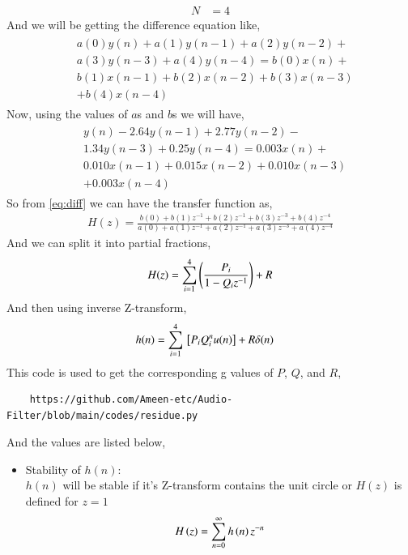 \documentclass[journal,12pt,twocolumn]{IEEEtran}
\theoremstyle{remark}
\begin{document}
\begin{enumerate}[label=\thesection.\arabic*]
\begin{align}
    N&=4
\end{align}
And we will be getting the difference equation like,
\begin{align}
\begin{split}
    &a(0)y(n)+a(1)y(n-1)+a(2)y(n-2)+\\
    &a(3)y(n-3)+a(4)y(n-4)=b(0)x(n)+\\
    &b(1)x(n-1)+b(2)x(n-2)+b(3)x(n-3)\\
    &+b(4)x(n-4) \label{eq:diff}
\end{split}
\end{align}
Now, using the values of $a$s and $b$s we will have,
\begin{align}
    \begin{split}
        &y(n)-2.64y(n-1)+2.77y(n-2)-\\
    &1.34y(n-3)+0.25y(n-4)=0.003x(n)+\\
    &0.010x(n-1)+0.015x(n-2)+0.010x(n-3)\\
    &+0.003x(n-4)
    \end{split}
\end{align}
So from \eqref{eq:diff} we can have the transfer function as,
\begin{align}
    H(z)=\frac{b(0)+b(1)z^{-1}+b(2)z^{-1}+b(3)z^{-3}+b(4)z^{-4}}{a(0)+a(1)z^{-1}+a(2)z^{-1}+a(3)z^{-3}+a(4)z^{-4}}
\end{align}
And we can split it into partial fractions,
\begin{align}
    H(z)=\sum_{i=1}^{4}\left(\frac{P_i}{1-Q_iz^{-1}}\right)+R
\end{align}
And then using inverse Z-transform,
\begin{align}
h(n) &= \sum_{i=1}^{4}{}\left[P_iQ^n_iu(n)\right] + R\delta(n)
	\label{eq:h-n-expr}
\end{align}
This code is used to get the corresponding g values of $P$, $Q$, and $R$,
\begin{lstlisting}
    https://github.com/Ameen-etc/Audio-Filter/blob/main/codes/residue.py
\end{lstlisting}
And the values are listed below,

\begin{itemize}
\vspace{1cm}
    \item {Stability of $h(n)$}:\\
$h(n)$ will be stable if it's Z-transform contains the unit circle or $H(z)$ is defined for $z=1$
\begin{align}
H\brak{z} &= \sum_{n = 0}^{\infty} h\brak{n}z^{-n}\\

\end{align}
\end{itemize}
\end{enumerate}
\end{document}

